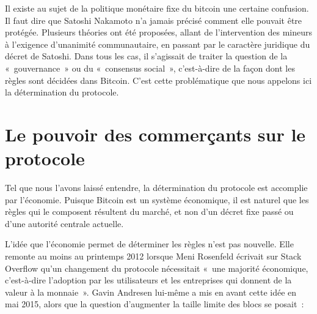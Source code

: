 Il existe au sujet de la politique monétaire fixe du bitcoin une certaine confusion. Il faut dire que Satoshi Nakamoto n'a jamais précisé comment elle pouvait être protégée. Plusieurs théories ont été proposées, allant de l'intervention des mineurs à l'exigence d'unanimité communautaire, en passant par le caractère juridique du décret de Satoshi. Dans tous les cas, il s'agissait de traiter la question de la «~gouvernance~» ou du «~consensus social~», c'est-à-dire de la façon dont les règles sont décidées dans Bitcoin. C'est cette problématique que nous appelons ici la détermination du protocole.

\section*{Le pouvoir des commerçants sur le protocole}

Tel que nous l'avons laissé entendre, la détermination du protocole est accomplie par l'économie. Puisque Bitcoin est un système économique, il est naturel que les règles qui le composent résultent du marché, et non d'un décret fixe passé ou d'une autorité centrale actuelle.

L'idée que l'économie permet de déterminer les règles n'est pas nouvelle. Elle remonte au moins au printemps 2012 lorsque Meni Rosenfeld écrivait sur Stack Overflow qu'un changement du protocole nécessitait «~une majorité économique, c'est-à-dire l'adoption par les utilisateurs et les entreprises qui donnent de la valeur à la monnaie~». Gavin Andresen lui-même a mis en avant cette idée en mai 2015, alors que la question d'augmenter la taille limite des blocs se posait~: %

